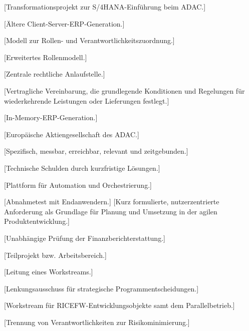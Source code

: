 [Transformationsprojekt zur S/4HANA-Einführung beim ADAC.]

[Ältere Client-Server-ERP-Generation.]

[Modell zur Rollen- und Verantwortlichkeitszuordnung.]

[Erweitertes Rollenmodell.]

[Zentrale rechtliche Anlaufstelle.]

[Vertragliche Vereinbarung, die grundlegende Konditionen und Regelungen für wiederkehrende Leistungen oder Lieferungen festlegt.]

[In-Memory-ERP-Generation.]

[Europäische Aktiengesellschaft des ADAC.]

[Spezifisch, messbar, erreichbar, relevant und zeitgebunden.]

[Technische Schulden durch kurzfristige Lösungen.]

[Plattform für Automation und Orchestrierung.]

[Abnahmetest mit Endanwendern.]
[Kurz formulierte, nutzerzentrierte Anforderung als Grundlage für Planung und Umsetzung in der agilen Produktentwicklung.]

[Unabhängige Prüfung der Finanzberichterstattung.]

[Teilprojekt bzw. Arbeitsbereich.]

[Leitung eines Workstreams.]

[Lenkungsausschuss für strategische Programmentscheidungen.]

[Workstream für RICEFW-Entwicklungsobjekte samt dem Parallelbetrieb.]

[Trennung von Verantwortlichkeiten zur Risikominimierung.]

